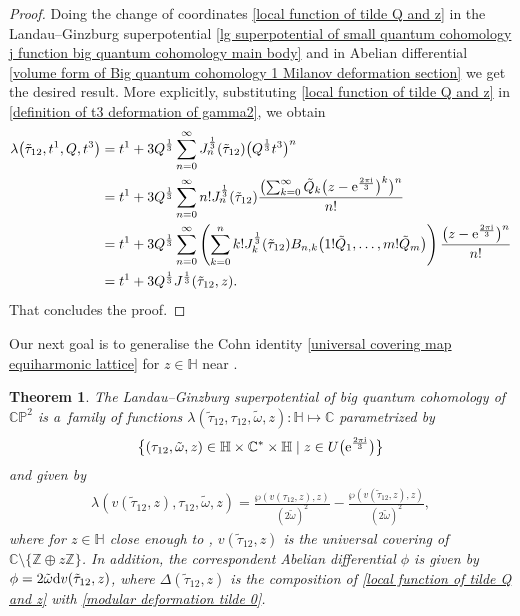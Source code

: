 \documentclass[pdftex]{sigma}
\numberwithin{equation}{section}
\newtheorem{Theorem}{Theorem}[section]
\begin{document}
\begin{proof}
Doing the change of coordinates \eqref{local function of tilde Q and z} in the Landau--Ginzburg superpotential \eqref{lg superpotential of small quantum cohomology j function big quantum cohomology main body} and in Abelian differential \eqref{volume form of Big quantum cohomology 1 Milanov deformation section} we get the desired result. More explicitly, substituting \eqref{local function of tilde Q and z} in \eqref{definition of t3 deformation of gamma2}, we obtain
\begin{align}
\lambda\bigl(\tilde\tau_{12},t^1,Q,t^3\bigr)&=t^1+3Q^{\frac{1}{3}}\sum_{n=0}^{\infty}J_n^{\frac{1}{3}}(\tilde\tau_{12})\bigl( Q^{\frac{1}{3}}t^3\bigr)^n\nonumber\\
&=t^1+3Q^{\frac{1}{3}}\sum_{n=0}^{\infty}n!J_n^{\frac{1}{3}}(\tilde\tau_{12})\frac{\bigl( \sum_{k=0}^{\infty}\tilde Q_k \bigl(z-{\rm e}^{\frac{2\pi {\rm i}}{3}} \bigr)^k \bigr)^n}{n!}\nonumber\\
&=t^1+3Q^{\frac{1}{3}}\sum_{n=0}^{\infty}\left( \sum_{k=0}^{n} k! J_k^{\frac{1}{3}}(\tilde\tau_{12}) B_{n,k}\bigl(1!\tilde Q_1,\dots,m!\tilde Q_m\bigr) \right)\frac{\bigl(z-{\rm e}^{\frac{2\pi {\rm i}}{3}} \bigr)^n}{n!}\nonumber\\
&=t^1+3Q^{\frac{1}{3}}J^{\frac{1}{3}}(\tilde\tau_{12},z).\label{Lg superpotential big quantum cohomology geo iso dif 12}
\end{align}
That concludes the proof.
\end{proof}

Our next goal is to generalise the Cohn identity \eqref{universal covering map equiharmonic lattice} for $z \in \mathbb{H}$ near .

\begin{Theorem}
The Landau--Ginzburg superpotential of big quantum cohomology of $\mathbb{CP}^2$ is a~family of functions
$
\lambda(\tilde\tau_{12}, \tau_{12}, \tilde\omega,z)\colon \mathbb{H} \mapsto \mathbb{C}
$
parametrized by
\begin{gather*}
\bigl\{(\tau_{12},\tilde\omega,z) \in \mathbb{H}\times\mathbb{C}^{*}\times\mathbb{H}\mid z \in U\bigl({\rm e}^{\frac{2\pi {\rm i}}{3}}\bigr) \bigr\}
\end{gather*}
and given by
\begin{gather*}
\lambda(v(\tilde\tau_{12},z),\tau_{12},\tilde\omega,z)=\frac{\wp(v(\tau_{12},z),z)}{\left(2\tilde\omega\right)^2}-\frac{\wp(v(\tilde\tau_{12},z),z)}{\left(2\tilde\omega\right)^2},
\end{gather*}
where for $z\in \mathbb{H}$ close enough to , $v(\tilde\tau_{12},z)$ is the universal covering of $\mathbb{C}\setminus\{\mathbb{Z}\oplus z\mathbb{Z} \}$.
 In addition, the correspondent Abelian differential $\phi$ is given by
$
\phi= 2\tilde\omega {\rm d}v(\tilde\tau_{12},z)$,
where $\Delta(\tilde\tau_{12},z)$ is the composition of \eqref{local function of tilde Q and z} with \eqref{modular deformation tilde 0}.
\end{Theorem}
\end{document}
